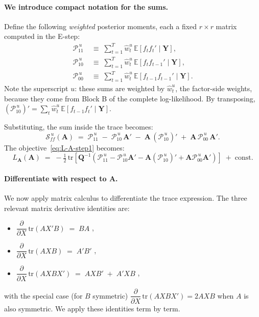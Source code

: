 \documentclass[11pt, a4paper, oneside]{article}
\newcommand{\mY}{\mathbf{Y}}
\newcommand{\mA}{\mathbf{A}}
\newcommand{\mQ}{\mathbf{Q}}
\begin{document}
\paragraph{We introduce compact notation for the sums.}
Define the following \emph{weighted} posterior moments, each a fixed
$r \times r$ matrix computed in the E-step:
\begin{equation}
\boxed{\;\;
\begin{aligned}
\mathcal{P}_{11}^{\,u}
&\;\equiv\; \sum_{t=1}^{T} \hat{w}^u_t\, \mathbb{E}[f_t f_t' \mid \mY], \\[3pt]
\mathcal{P}_{10}^{\,u}
&\;\equiv\; \sum_{t=1}^{T} \hat{w}^u_t\, \mathbb{E}[f_t f_{t-1}' \mid \mY], \\[3pt]
\mathcal{P}_{00}^{\,u}
&\;\equiv\; \sum_{t=1}^{T} \hat{w}^u_t\, \mathbb{E}[f_{t-1} f_{t-1}' \mid \mY].
\end{aligned}
\;\;}
\label{eq:Pu-definitions}
\end{equation}
Note the superscript $u$: these sums are weighted by $\hat{w}^u_t$, the
factor-side weights, because they come from Block B of the complete
log-likelihood. By transposing,
$(\mathcal{P}_{10}^{\,u})' = \sum_t \hat{w}^u_t\, \mathbb{E}[f_{t-1} f_t' \mid \mY]$.

Substituting, the sum inside the trace becomes:
\[
\mathcal{S}_{ff}^{\,u}(\mA)
\;=\; \mathcal{P}_{11}^{\,u} \;-\; \mathcal{P}_{10}^{\,u}\,\mA'
\;-\; \mA\,(\mathcal{P}_{10}^{\,u})' \;+\; \mA\, \mathcal{P}_{00}^{\,u}\, \mA'.
\]
The objective~\eqref{eq:L-A-step1} becomes:
\begin{equation}
L_{\mA}(\mA) \;=\; -\tfrac{1}{2}\,\mathrm{tr}\!\left[\mQ^{-1}\!\left(
\mathcal{P}_{11}^{\,u} - \mathcal{P}_{10}^{\,u}\mA' - \mA(\mathcal{P}_{10}^{\,u})'  + \mA \mathcal{P}_{00}^{\,u} \mA'\right)\right] \;+\; \text{const}.
\label{eq:L-A-step3}
\end{equation}

\paragraph{Differentiate with respect to $\mA$.}
We now apply matrix calculus to differentiate the trace expression.
The three relevant matrix derivative identities are:
\begin{itemize}[leftmargin=1.5em, itemsep=2pt]
    \item $\dfrac{\partial}{\partial X}\,\mathrm{tr}(A X' B) \;=\; B A$ ,
    \item $\dfrac{\partial}{\partial X}\,\mathrm{tr}(A X B) \;=\; A' B'$ ,
    \item $\dfrac{\partial}{\partial X}\,\mathrm{tr}(A X B X') \;=\; A X B' \;+\; A' X B$ ,
\end{itemize}
with the special case (for $B$ symmetric) $\dfrac{\partial}{\partial X}\,\mathrm{tr}(A X B X') = 2 A X B$ when $A$ is also symmetric. We apply these identities term by term.
\end{document}
